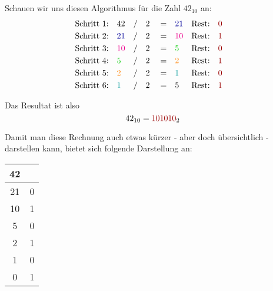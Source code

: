 Schauen wir uns diesen Algorithmus für die Zahl $42_{10}$ an:
\begin{align*}
	&\text{Schritt 1:}& &42                     & &/& &2& &=& &\textcolor{blue}{21}   & &\text{Rest:}& &\textcolor{red}{0}& \\
	&\text{Schritt 2:}& &\textcolor{blue}{21}   & &/& &2& &=& &\textcolor{magenta}{10}& &\text{Rest:}& &\textcolor{red}{1}& \\
	&\text{Schritt 3:}& &\textcolor{magenta}{10}& &/& &2& &=& &\textcolor{green}{5}   & &\text{Rest:}& &\textcolor{red}{0}& \\
	&\text{Schritt 4:}& &\textcolor{green}{5}   & &/& &2& &=& &\textcolor{orange}{2}  & &\text{Rest:}& &\textcolor{red}{1}& \\
	&\text{Schritt 5:}& &\textcolor{orange}{2}  & &/& &2& &=& &\textcolor{cyan}{1}    & &\text{Rest:}& &\textcolor{red}{0}& \\
	&\text{Schritt 6:}& &\textcolor{cyan}{1}    & &/& &2& &=& &\textcolor{black}{5}   & &\text{Rest:}& &\textcolor{red}{1}&   
\end{align*}

Das Resultat ist also
$$42_{10} = \textcolor{red}{101010}_2$$

Damit man diese Rechnung auch etwas kürzer - aber doch übersichtlich - darstellen kann, bietet sich folgende Darstellung an:
\begin{table}[H]
	\centering
	\renewcommand{\arraystretch}{1.5}
	\begin{tabular}{|c|c|}
	\hline
	\textbf{42} & \\ \hline
	21 & 0 \\ \hline
	10 & 1 \\ \hline
	 5 & 0 \\ \hline
	 2 & 1 \\ \hline
	 1 & 0 \\ \hline
	 0 & 1 \\ \hline
	\end{tabular}
\end{table}

\newpage 

